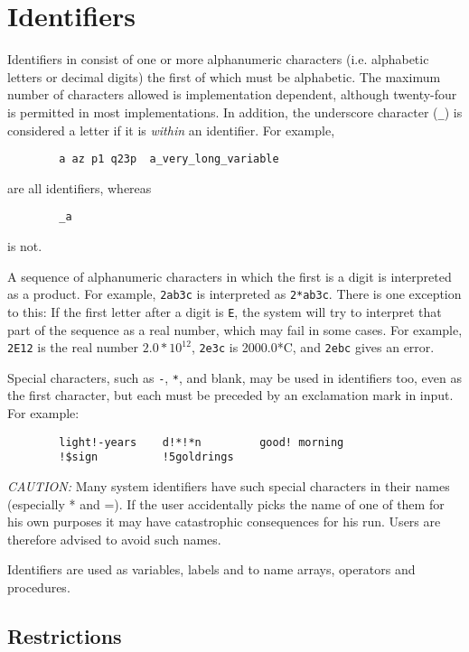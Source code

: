 \section{Identifiers}

Identifiers in {\REDUCE} consist of one or more
alphanumeric characters (i.e. alphabetic letters or decimal
digits) the first of which must be alphabetic.  The maximum number of
characters allowed is implementation dependent, although twenty-four is
permitted in most implementations.  In addition, the underscore character
(\texttt{\_}) is considered a letter if it is \emph{within} an identifier.
For example,
\begin{verbatim}
        a az p1 q23p  a_very_long_variable
\end{verbatim}
are all identifiers, whereas
\begin{verbatim}
        _a
\end{verbatim}
is not.

A sequence of alphanumeric characters in which the first is a digit is
interpreted as a product.  For example, \texttt{2ab3c} is interpreted as
\texttt{2*ab3c}.  There is one exception to this:  If the first letter after a
digit is \texttt{E}, the system will try to interpret that part of the
sequence as a real number, which may fail in some cases.  For
example, \texttt{2E12} is the real number $2.0*10^{12}$, \texttt{2e3c} is
2000.0*C, and \texttt{2ebc} gives an error.

Special characters, such as \texttt{-}, \texttt{*}, and blank, may be
used in identifiers
too, even as the first character, but each must be preceded by an
exclamation mark in input.  For example:
\begin{verbatim}
        light!-years    d!*!*n         good! morning
        !$sign          !5goldrings
\end{verbatim}
\textit{CAUTION:} Many system identifiers have such special characters in their
names (especially * and =). If the user accidentally picks the name of one
of them for his own purposes it may have catastrophic consequences for his
{\REDUCE} run.  Users are therefore advised to avoid such names.

Identifiers are used as variables, labels and to name arrays, operators
and procedures.

\subsection*{Restrictions}

